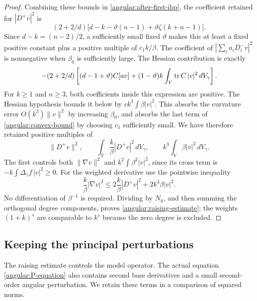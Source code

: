 \begin{proof}
Combining these bounds in \eqref{angular:after-first-ibp}, the coefficient
retained for $|D^+v|^2$ is
\begin{equation}\label{angular:positive-degree-factor}
 (2+2/d)\bigl[d-k-\vartheta(n-1)
                         +\vartheta\zeta(k+n-1)\bigr].
\end{equation}
Since $d-k=(n-2)/2$, a sufficiently small fixed $\vartheta$ makes this
at least a fixed positive constant plus a positive multiple of
$c_1k/\beta$.  The coefficient of
$|\sum_i a_iD_i^-v|^2$ is nonnegative when $\beta_0$ is sufficiently
large.  The Hessian contribution is exactly
\begin{equation}\label{angular:hessian-contribution}
 -(2+2/d)\left[(d-1+\vartheta)C[av]
       +(1-\vartheta)k\int_Y\operatorname{tr} C\,|v|^2\,dV_\gamma\right].
\end{equation}
For $k\ge1$ and $n\ge3$, both coefficients inside this expression are
positive.  The Hessian hypothesis bounds it below by
$c k^3\int\beta|v|^2$.  This absorbs the curvature error $O(k^3)\|v\|^2$
by increasing $\beta_0$, and absorbs the last term of
\eqref{angular:convex-bound} by choosing $c_1$ sufficiently small.
We have therefore retained positive multiples of
\[
 \|D^+v\|^2,\qquad
 \int_Y\frac{k}{\beta}|D^+v|^2\,dV_\gamma,
 \qquad k^3\int_Y\beta|v|^2\,dV_\gamma.
\]
The first controls both $\|\nabla v\|^2$ and
$k^2\int\beta^2|v|^2$, since its cross term is
$-k\int\Delta_\gamma f\,|v|^2\ge0$.  For the weighted derivative use the
pointwise inequality
\[
 \frac{k}{\beta}|\nabla v|^2
 \le2\frac{k}{\beta}|D^+v|^2+2k^3\beta|v|^2.
\]
No differentiation of $\beta^{-1}$ is required.  Dividing by $N_k$, and
then summing the orthogonal degree components, proves
\eqref{angular:raising-estimate}; the weights $(1+k)^s$ are comparable
to $k^s$ because the zero degree is excluded.
\end{proof}

\subsection{Keeping the principal perturbations}

The raising estimate controls the model operator.  The actual equation
\eqref{angular:P-equation} also contains second base derivatives and a
small second-order angular perturbation.  We retain these terms in a
comparison of squared norms.

